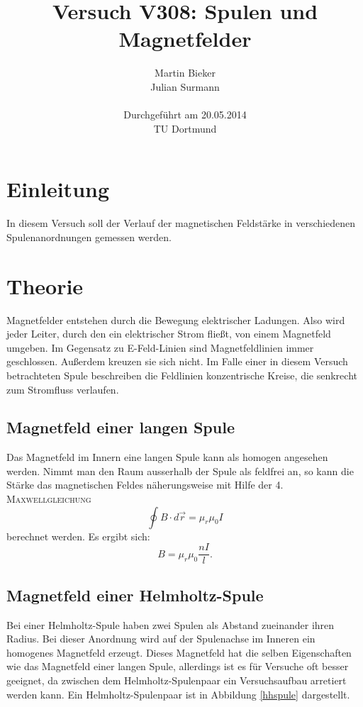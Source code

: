 \documentclass[11pt,ngerman,a4paper]{article}
\title{\textbf{Versuch V308: Spulen und Magnetfelder}}
\author{Martin Bieker\\
		Julian Surmann\\
		\\
		Durchgef\"{u}hrt am 20.05.2014\\
		TU Dortmund}
\date{}
\begin{document}
\renewcommand\tablename{Tabelle}
\renewcommand\figurename{Abbildung}
\maketitle
\thispagestyle{empty}
\newpage
\clearpage
\setcounter{page}{1}


\section{Einleitung}
In diesem Versuch soll der Verlauf der magnetischen Feldstärke in verschiedenen Spulenanordnungen gemessen werden. 
\section{Theorie}
Magnetfelder entstehen durch die Bewegung elektrischer Ladungen. Also wird jeder Leiter, durch den ein elektrischer Strom fließt, von einem Magnetfeld umgeben. Im Gegensatz zu E-Feld-Linien sind Magnetfeldlinien immer geschlossen. Außerdem kreuzen sie sich nicht. Im Falle einer in diesem Versuch betrachteten Spule beschreiben die Feldlinien konzentrische Kreise, die senkrecht zum Stromfluss verlaufen.

\subsection{Magnetfeld einer langen Spule}
Das Magnetfeld im Innern eine langen Spule kann als homogen angesehen werden. Nimmt man den Raum ausserhalb der Spule als feldfrei an, so kann die Stärke das magnetischen Feldes näherungsweise mit Hilfe der \textsc{4. Maxwellgleichung} 
\begin{equation}
\oint B\cdot d\vec r = \mu_r\mu_0 I
\end{equation}
berechnet werden. Es ergibt sich:
\
\begin{equation}
B = \mu_r\mu_0\frac{nI}l\mathrm.
\end{equation}
\subsection{Magnetfeld einer Helmholtz-Spule}
Bei einer Helmholtz-Spule haben zwei Spulen als Abstand zueinander ihren Radius. Bei dieser Anordnung wird auf der Spulenachse im Inneren ein homogenes Magnetfeld erzeugt. Dieses Magnetfeld hat die selben Eigenschaften wie das Magnetfeld einer langen Spule, allerdings ist es für Versuche oft besser geeignet, da zwischen dem Helmholtz-Spulenpaar ein Versuchsaufbau arretiert werden kann. Ein Helmholtz-Spulenpaar ist in Abbildung \ref{hhspule} dargestellt.
\end{document}

